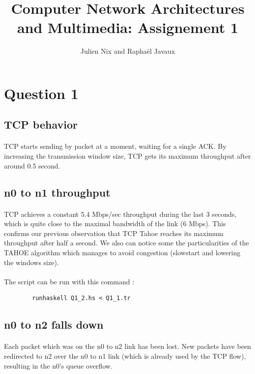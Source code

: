 \documentclass[a4paper]{article}
\title{Computer Network Architectures and Multimedia: Assignement 1}
\author{Julien Nix and Raphaël Javaux}
\date{}
\begin{document}
\maketitle

 \section{Question 1}

   \subsection{TCP behavior}

    \paragraph{}TCP starts sending by packet at a moment, waiting for a single ACK.
By increasing the transmission window size, TCP gets its maximum throughput
after around 0.5 second.

   \subsection{n0 to n1 throughput}

    \paragraph{}TCP achieves a constant 5.4 Mbps/sec throughput during the last
3 seconds, which is quite close to the maximal bandwidth of the link (6 Mbps).
This confirms our previous observation that TCP Tahoe reaches its maximum
throughput after half a second. We also can notice some the particularities of the TAHOE algorithm which manages to avoid congestion (slowstart and lowering the windows size).

    \paragraph{}The script can be run with this command :
    \begin{verbatim}
        runhaskell Q1_2.hs < Q1_1.tr
    \end{verbatim}

   \subsection{n0 to n2 falls down}

   \paragraph{}Each packet which was on the n0 to n2 link has been lost.
New packets have been redirected to n2 over the n0 to n1 link (which is already
used by the TCP flow), resulting in the n0's queue overflow.
\end{document}
